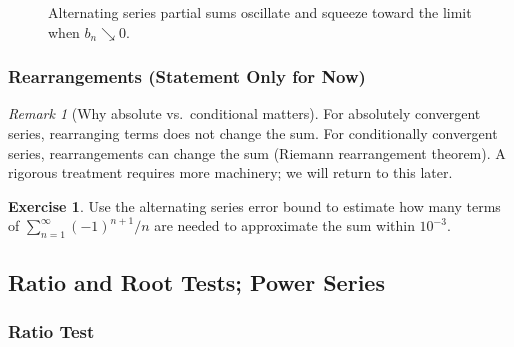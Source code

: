 \documentclass[12pt]{article}
\numberwithin{equation}{section}
\theoremstyle{plain}
\theoremstyle{definition}
\newtheorem{exercise}[theorem]{Exercise}
\theoremstyle{remark}
\newtheorem{remark}[theorem]{Remark}
\begin{document}
\begin{figure}[H]
\centering
{}
\caption{Alternating series partial sums oscillate and squeeze toward the limit when $b_n\searrow 0$.}
\end{figure}

\subsubsection{Rearrangements (Statement Only for Now)}

\begin{remark}[Why absolute vs.\ conditional matters]
For absolutely convergent series, rearranging terms does not change the sum.
For conditionally convergent series, rearrangements can change the sum (Riemann rearrangement theorem).
A rigorous treatment requires more machinery; we will return to this later.
\end{remark}

\begin{exercise}
Use the alternating series error bound to estimate how many terms of $\sum_{n=1}^{\infty}(-1)^{n+1}/n$ are needed to approximate the sum within $10^{-3}$.
\end{exercise}

\newpage

\subsection{Ratio and Root Tests; Power Series}

\subsubsection{Ratio Test}
\end{document}
